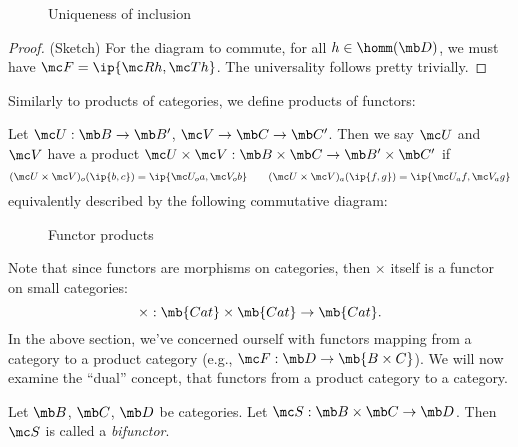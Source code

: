 \documentclass[nocover]{pset}
\begin{document}
\begin{adjustwidth}{1em}{1em}
\begin{theorem}
\begin{figure}[H]
      \caption{Uniqueness of inclusion}
    \end{figure}
  \end{theorem}
  \begin{proof} (Sketch) For the diagram to commute, for all $h \in
    \homm(\mb D)$, we must have $\mc F = \ip{\mc R h, \mc T h}$. The
    universality follows pretty trivially.
  \end{proof}
  Similarly to products of categories, we define products of functors:
  \begin{definition}
    Let $\mc U : \mb B \to \mb B'$, $\mc V \to \mb C \to \mb C'$. Then
    we say $\mc U$ and $\mc V$ have a product $\mc U \times \mc V :
    \mb B \times \mb C \to \mb B' \times \mb C'$ if
    \[
      (\mc U \times \mc V)_o(\ip{b,c}) = \ip{\mc U_o a, \mc V_o b} \qquad
      (\mc U \times \mc V)_a(\ip{f,g}) = \ip{\mc U_a f, \mc V_a g}
    \]
    equivalently described by the following commutative diagram:
    \begin{figure}[H]
      \centering
      \caption{Functor products}
    \end{figure}
  \end{definition}
  Note that since functors are morphisms on categories, then $\times$
  itself is a functor on small categories:
  \[
    \times : \mb{Cat} \times \mb{Cat} \to \mb{Cat}.
  \]
  In the above section, we've concerned ourself with functors mapping
  from a category to a product category (e.g., $\mc F : \mb D \to
  \mb{B \times C}$). We will now examine the ``dual'' concept, that
  functors from a product category to a category.
  \begin{definition}[Bifunctor]
    Let $\mb B$, $\mb C$, $\mb D$ be categories. Let $\mc S : \mb B
    \times \mb C \to \mb D$. Then $\mc S$ is called a
    \emph{bifunctor}.
  \end{definition}


\end{adjustwidth}
\end{document}
